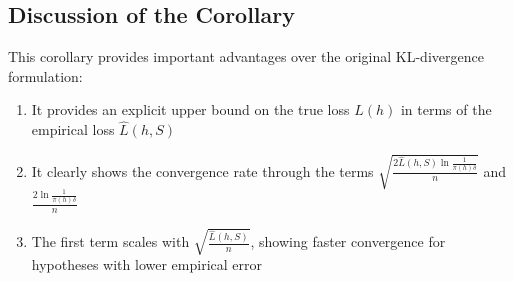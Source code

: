 \subsection*{Discussion  of the Corollary}

This corollary provides important advantages over the original KL-divergence formulation:

\begin{enumerate}
\item It provides an explicit upper bound on the true loss $L(h)$ in terms of the empirical loss $\hat{L}(h,S)$
\item It clearly shows the convergence rate through the terms $\sqrt{\frac{2\hat{L}(h,S)\ln \frac{1}{\pi(h)\delta}}{n}}$ and $\frac{2\ln \frac{1}{\pi(h)\delta}}{n}$
\item The first term scales with $\sqrt{\frac{\hat{L}(h,S)}{n}}$, showing faster convergence for hypotheses with lower empirical error
\end{enumerate}
